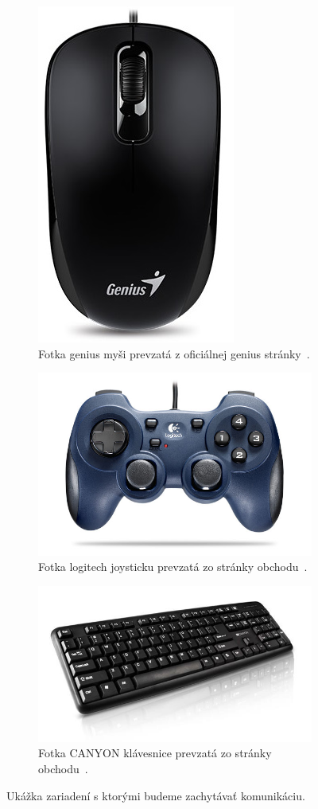 \begin{figure}[!htb]
\centering
\begin{subfigure}{.4\textwidth}
  \centering
  \includegraphics[width=.4\linewidth]{img/genius_mys.jpg}
  \caption{Fotka genius myši prevzatá z oficiálnej genius stránky~\cite{genius_mouse_pic}.}
  \label{obr:kap6:genius:mouse:pic}
\end{subfigure}%
\begin{subfigure}{.6\textwidth}
  \centering
  \includegraphics[width=.6\linewidth]{img/kap06_joystick}
  \caption{Fotka logitech joysticku prevzatá zo stránky obchodu~\cite{logitech_joystick_pic}.}
  \label{obr:kap6:joystick_obr}
\end{subfigure}
\begin{subfigure}{\textwidth}
  \centering
  \includegraphics[width=\textwidth]{img/kap06_keyboard}
  \caption{Fotka CANYON klávesnice prevzatá zo stránky obchodu~\cite{canyon_keyboard_pic}.}
  \label{obr:kap6:keyboard_obr}
\end{subfigure}
\caption{Ukážka zariadení s ktorými budeme zachytávať komunikáciu.}
\label{obr:kap6:devices}
\end{figure}


